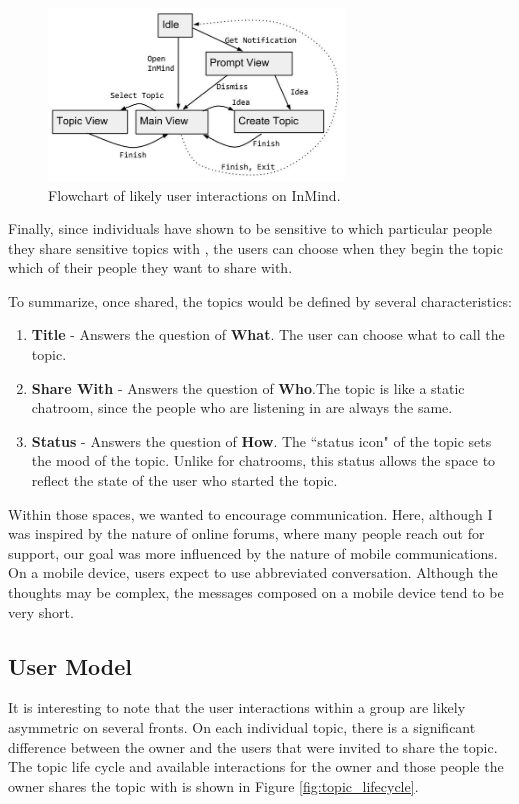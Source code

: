   \begin{figure}
  \centering
  \includegraphics[width=0.7\textwidth]{user_interaction.jpg}
  \caption{Flowchart of likely user interactions on InMind.}
  \label{fig:user_interaction}
  \end{figure}

  Finally, since individuals have shown to be sensitive
  to which particular people they share
  sensitive topics with \cite{patil05},
  the users can choose when they begin the topic
  which of their people they want to share with.

  To summarize, once shared, the topics would be defined by several characteristics:

  \begin{enumerate}
  \item \textbf{Title} - Answers the question of \textbf{What}. The user can choose what to call the topic.
  \item \textbf{Share With} - Answers the question of \textbf{Who}.The topic is like a static chatroom,
    since the people who are listening in are always the same.
  \item \textbf{Status} - Answers the question of \textbf{How}. The ``status icon" of the topic sets the mood
    of the topic. Unlike for chatrooms,
    this status allows the space to reflect the state
    of the user who started the topic.
  \end{enumerate}

  Within those spaces, we wanted to encourage communication.
  Here, although I was inspired by the nature of online forums,
  where many people reach out for support,
  our goal was more influenced by the nature of mobile communications.
  On a mobile device, users expect to use abbreviated conversation.
  Although the thoughts may be complex, the messages composed on a mobile device
  tend to be very short.

    \subsection{User Model}
      It is interesting to note that the user interactions within a group
      are likely asymmetric on several fronts.
      On each individual topic, there is a significant difference between the owner
      and the users that were invited to share the topic.
      The topic life cycle and available interactions for the owner
      and those people the owner shares the topic with
      is shown in Figure \ref{fig:topic_lifecycle}.

